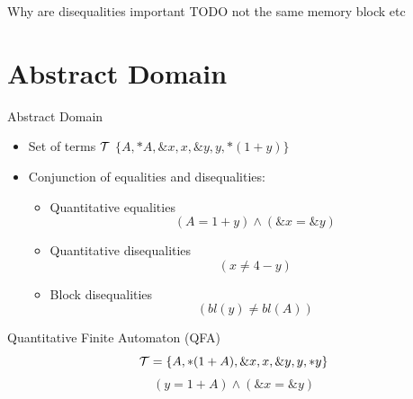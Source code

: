 \documentclass{beamer}
\begin{document}
\begin{frame}{Why are disequalities important}
    TODO
    not the same memory block etc
\end{frame}

\section{Abstract Domain}
\frame{\tableofcontents[currentsection]}

\begin{frame}{Abstract Domain}
    \begin{itemize}
        \item Set of terms $\mathcal{T}$
              $\{A, *A, \&x, x, \&y, y, *(1+y)\}$
        \item Conjunction of equalities and disequalities:
              \begin{itemize}
                  \item Quantitative equalities
                        \[
                            (A = 1 + y) \land (\&x = \&y)
                        \]
                  \item Quantitative disequalities
                        \[
                            (x \neq 4 - y)
                        \]
                  \item Block disequalities
                        \[
                            (bl(y) \neq bl(A))
                        \]
              \end{itemize}
    \end{itemize}
\end{frame}

\begin{frame}{Quantitative Finite Automaton (QFA)}
    \[
        \mathcal{T}=\{A, *(1 + A), \&x, x, \&y, y, *y\}
    \]
    \[
        (y = 1 + A) \land (\&x = \&y)
    \]
    \centering
\end{frame}
\end{document}
